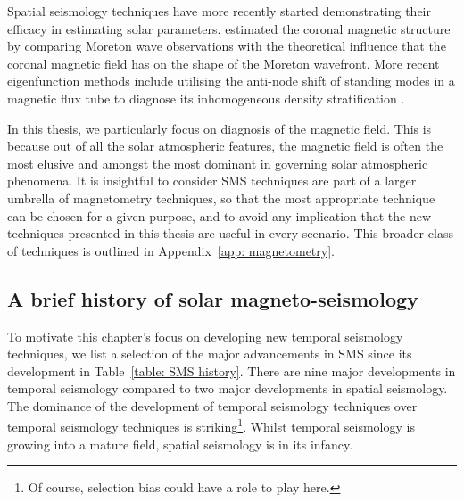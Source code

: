 Spatial seismology techniques have more recently started demonstrating their efficacy in estimating solar parameters. \cite{uch70} estimated the coronal magnetic structure by comparing Moreton wave observations with the theoretical influence that the coronal magnetic field has on the shape of the Moreton wavefront. More recent eigenfunction methods include utilising the anti-node shift of standing modes in a magnetic flux tube to diagnose its inhomogeneous density stratification \citep{erd_etal07,ver_etal07,erd_etal14}.

In this thesis, we particularly focus on diagnosis of the magnetic field. This is because out of all the solar atmospheric features, the magnetic field is often the most elusive and amongst the most dominant in governing solar atmospheric phenomena. It is insightful to consider SMS techniques are part of a larger umbrella of magnetometry techniques, so that the most appropriate technique can be chosen for a given purpose, and to avoid any implication that the new techniques presented in this thesis are useful in every scenario. This broader class of techniques is outlined in Appendix~\ref{app: magnetometry}.


\subsection{A brief history of solar magneto-seismology} \label{sec: SMS history}

To motivate this chapter's focus on developing new temporal seismology techniques, we list a selection of the major advancements in SMS since its development in Table~\ref{table: SMS history}. There are nine major developments in temporal seismology compared to two major developments in spatial seismology. The dominance of the development of temporal seismology techniques over temporal seismology techniques is striking\footnote{Of course, selection bias could have a role to play here.}. Whilst temporal seismology is growing into a mature field, spatial seismology is in its infancy.

